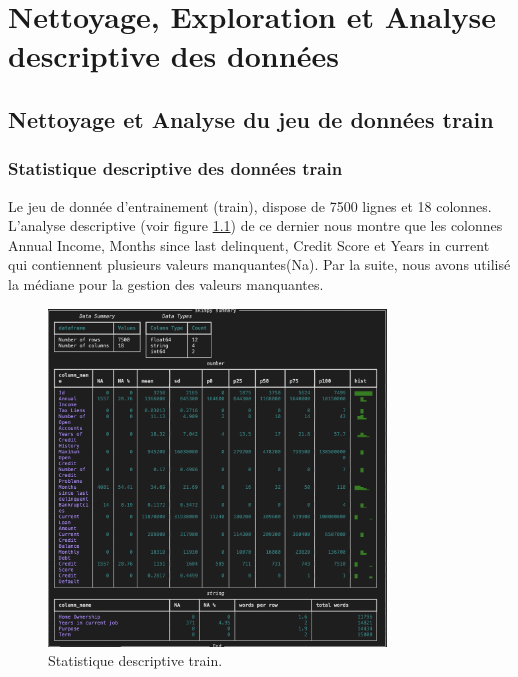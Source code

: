 
\chapter{Nettoyage, Exploration et Analyse descriptive des données}
\minitoc
\newpage
\section{Nettoyage et Analyse du jeu de données train}


\subsection{Statistique descriptive des données train }
Le jeu de donnée d'entrainement (train), dispose de 7500 lignes et 18 colonnes. L'analyse descriptive (voir figure \ref{fig:stat_descriptive}) de ce dernier nous montre que les colonnes Annual Income, Months since last delinquent, Credit Score et Years in current qui contiennent plusieurs valeurs manquantes(Na). Par la suite, nous avons utilisé la médiane pour la gestion des valeurs manquantes. 

\begin{figure}[H]
\centering
\includegraphics[width=0.8\textwidth]{figures/fig1.png}
\caption{Statistique descriptive train.}
\label{fig:stat_descriptive}
\end{figure}

